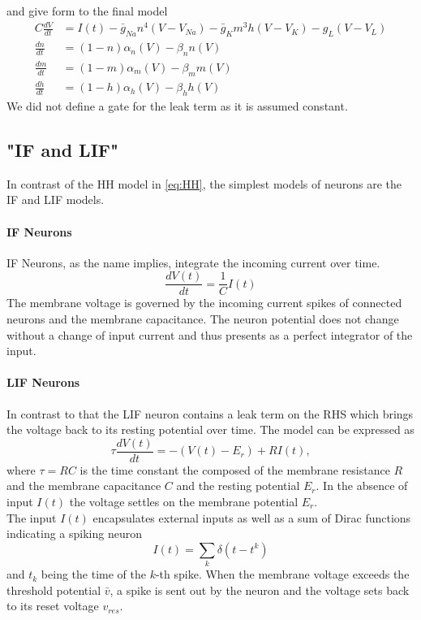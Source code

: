 and give form to the final model
\begin{equation}\label{eq:HH}
\begin{aligned}
C\frac{dV}{dt} &= I(t) -\bar{g}_{Na} n^4(V-V_{Na}) - \bar{g}_{K} m^3h(V-V_{K}) -g_L(V-V_{L})\\
\frac{dn}{dt} &= (1-n)\alpha_n(V) - \beta_n n (V)\\
\frac{dm}{dt} &= (1-m)\alpha_m(V) - \beta_m m (V)\\
\frac{dh}{dt} &= (1-h)\alpha_h(V) - \beta_h h (V)
\end{aligned}
\end{equation}
We did not define a gate for the leak term as it is assumed constant.
\subsection{"IF and LIF"}
In contrast of the \ac{HH} model in \cref{eq:HH}, the simplest models of neurons are the \ac{IF} and \ac{LIF} models.\\
\paragraph{IF Neurons}
\ac{IF} Neurons, as the name implies, integrate the incoming current over time.
\begin{equation}
\frac{d V(t)}{d t} = \frac{1}{C}I(t)
\end{equation}
The membrane voltage is governed by the incoming current spikes of connected neurons and the membrane capacitance. The neuron potential does not change without a change of input current and thus presents as a perfect integrator of the input.\\
\paragraph{\ac{LIF} Neurons}
In contrast to that the \ac{LIF} neuron contains a leak term on the RHS which brings the voltage back to its resting potential over time. The model can be expressed as
\begin{equation}
\tau\frac{dV(t)}{dt} = -(V(t)-E_r) + RI(t),
\end{equation}
where $\tau = RC$ is the time constant the composed of the membrane resistance $R$ and the membrane capacitance $C$ and the resting potential $E_r$. In the absence of input $I(t)$ the voltage settles on the membrane potential $E_r$.\\
The input $I(t)$ encapsulates external inputs as well as a sum of Dirac functions indicating a spiking neuron
\begin{equation}
I(t) = \sum_k \delta(t-t^k)
\end{equation}
and $t_k$ being the time of the $k$-th spike. When the membrane voltage exceeds the threshold potential $\bar{v}$, a spike is sent out by the neuron and the voltage sets back to its reset voltage $v_{res}$.

